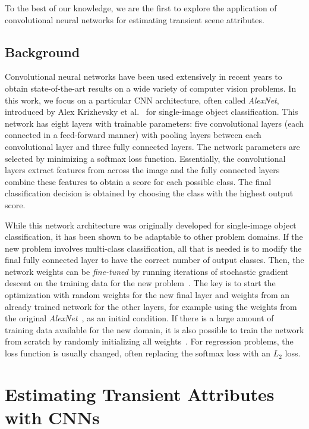 \documentclass[10pt,twocolumn,letterpaper]{article}
\begin{document}
To the best of our knowledge, we are the first to explore the application of
convolutional neural networks for estimating transient scene attributes.

\subsection{Background}

Convolutional neural networks have been used extensively in recent years to
obtain state-of-the-art results on a wide variety of computer vision problems.
In this work, we focus on a particular CNN architecture, often called {\em
AlexNet}, introduced by Alex Krizhevsky et al.~\cite{krizhevsky2012imagenet} for
single-image object classification. This network has eight layers with
trainable parameters: five convolutional layers (each connected in a
feed-forward manner) with pooling layers between each convolutional layer and
three fully connected layers. The network parameters are selected by minimizing
a softmax loss function. Essentially, the convolutional layers extract features
from across the image and the fully connected layers combine these features to
obtain a score for each possible class. The final classification decision is
obtained by choosing the class with the highest output score.  

While this network architecture was originally developed for single-image
object classification, it has been shown to be adaptable to other problem
domains. If the new problem involves multi-class classification, all that is
needed is to modify the final fully connected layer to have the correct number
of output classes. Then, the network weights can be {\em fine-tuned} by running
iterations of stochastic gradient descent on the training data for the new
problem~\cite{yosinski2014transferable}.  The key is to start the optimization
with random weights for the new final layer and weights from an already trained
network for the other layers, for example using the weights from the original
\emph{AlexNet}~\cite{krizhevsky2012imagenet}, as an initial condition. If there is a large
amount of training data available for the new domain, it is also possible to
train the network from scratch by randomly initializing all
weights~\cite{zhou2014places}.  For regression problems, the loss
function is usually changed, often replacing the softmax loss with an
$L_2$ loss.

\section{Estimating Transient Attributes with CNNs}
\label{sec:method}
\end{document}
